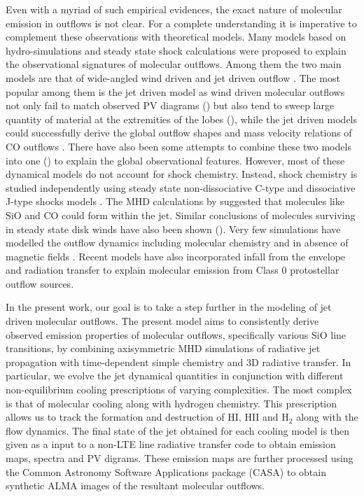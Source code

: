 \documentclass[useAMS,usenatbib]{mn2e}
\begin{document}
Even with a myriad of such empirical evidences, the exact nature of
molecular emission in outflows is not clear. For a complete understanding it is imperative
to complement these observations with theoretical models. Many models
based on hydro-simulations and steady state shock calculations
were proposed to explain the observational signatures of molecular
outflows. Among them the two main models are that of wide-angled wind
driven \cite{Shu:1991p14071} and jet driven outflow
\cite{Canto:1991p14123}. 
The most popular among them is the jet driven model as wind
driven molecular outflows not only fail to match observed PV diagrams (\citealt{Cabrit:1992p14098})
but also tend to sweep large quantity of material at the extremities
of the lobes (\citealt{Masson:1992p14101}), while the jet driven models could successfully
derive the global outflow shapes and mass velocity relations of CO
outflows \citep{Raga:1993p9948,
  Masson:1993p9661,Downes:2003p9946,Downes:2007p9514}. 
There have also been some attempts to combine these two
models into one (\citealt{Shang:2006p14268}) to explain the global observational features. 
However, most of these dynamical models do not
account for shock chemistry. Instead, shock chemistry is studied
independently using steady state non-dissociative C-type and
dissociative J-type shocks models \citep{Neufeld:1989p11689, Schilke:1997p14140,Flower:2003p11236}. 
The MHD calculations by \cite{Glassgold:1991p13703} suggested that molecules
like SiO and CO could form within the jet. Similar conclusions of
molecules surviving in steady state disk winds have also been shown
(\citealt{Panoglou:2012p10039}). 
Very few simulations have modelled the outflow
dynamics including molecular chemistry and in absence of
magnetic fields \citep{Raga:1995p12965, Smith:2003p9985}. 
Recent models have also incorporated
infall from the envelope \citep{Rawlings:2013p14920} and radiation
transfer \citep{Offner:2011p14861} to explain molecular 
emission from Class 0 protostellar outflow sources. 



%
In the present work, our goal is to take a step further in the modeling of
jet driven molecular outflows. The present model aims to consistently derive observed emission properties of molecular outflows, specifically various SiO line
transitions, by combining axisymmetric MHD simulations of
radiative jet propagation with time-dependent simple chemistry and 3D radiative
transfer. In particular, we evolve the jet dynamical
quantities in conjunction with different non-equilibrium cooling
prescriptions of varying complexities. The most complex is that of
molecular cooling along with hydrogen chemistry. This prescription
allows us to track the formation and destruction of 
HI, HII and H$_{2}$ along with the flow dynamics. 
The final state of the jet obtained for each cooling model is then
given as a input to a non-LTE line radiative transfer code
to obtain emission maps, spectra and PV digrams. These emission maps
are further processed using the Common Astronomy Software Applications
package (CASA) to obtain synthetic ALMA images of the resultant molecular outflows.
%
\end{document}
